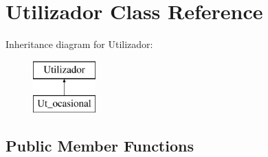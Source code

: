 \hypertarget{class_utilizador}{\section{Utilizador Class Reference}
\label{class_utilizador}
}
Inheritance diagram for Utilizador\+:\begin{figure}[H]
\begin{center}
\leavevmode
\includegraphics[height=2.000000cm]{class_utilizador}
\end{center}
\end{figure}
\subsection*{Public Member Functions}
